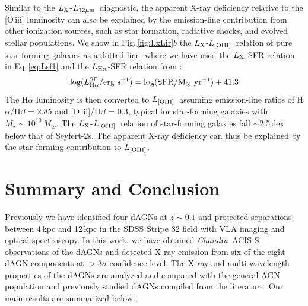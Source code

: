 \documentclass[iop,revtex4,twocolumn,apj,numberedappendix,appendixfloats]{emulateapj}
\newcommand{\msun}{$M_{\odot}$}
\newcommand{\lx}{$L_{\rm X}$}
\newcommand{\lmir}{$L_{\rm 12\mu m}$}
\newcommand{\loiii}{$L_{\rm [OIII]}$}
\newcommand{\chandra}{{\it Chandra}}
\begin{document}
Similar to the \lx-\lmir\ diagnostic, the apparent X-ray deficiency relative to the [O\,{\sc iii}] luminosity can also be explained by the emission-line contribution from other ionization sources, such as star formation, radiative shocks, and evolved stellar populations. We show in Fig.\,\ref{fig:LxLir}$b$ the \lx-\loiii\ relation of pure star-forming galaxies as a dotted line, where we have used the \lx-SFR relation in Eq.\,\ref{eq:Lsf1} and the $L_{\rm H\alpha}$-SFR relation from \citet{Murphy11}: 
\begin{equation}
\log(L^{\rm SF}_{\rm H\alpha}/{\rm erg\ s^{-1}}) = \log({\rm SFR/M_\odot\ yr^{-1}}) + 41.3
\label{eq:lsf2}
\end{equation}
The H$\alpha$ luminosity is then converted to \loiii\ assuming emission-line ratios of H$\alpha$/H$\beta$ = 2.85 and [O\,{\sc iii}]/H$\beta$ = 0.3, typical for star-forming galaxies with $M_\star \sim 10^{10}$\,\msun. The \lx-\loiii\ relation of star-forming galaxies fall $\sim$2.5\,dex below that of Seyfert-2s. The apparent X-ray deficiency can thus be explained by the star-forming contribution to \loiii.

\section{Summary and Conclusion} \label{sec:summary}

Previously we have identified four dAGNs at $z \sim 0.1$ and projected separations between 4\,kpc and 12\,kpc in the SDSS Stripe 82 field with VLA imaging and optical spectroscopy. In this work, we have obtained \chandra\ ACIS-S observations of the dAGNs and detected X-ray emission from six of the eight dAGN components at $>$3$\sigma$ confidence level. The X-ray and multi-wavelength properties of the dAGNs are analyzed and compared with the general AGN population and previously studied dAGNs compiled from the literature. Our main results are summarized below:
\end{document}
